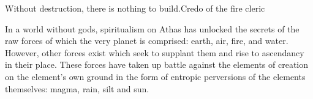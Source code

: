 {Without destruction, there is nothing to build.}{Credo of the fire cleric}


In a world without gods, spiritualism on Athas has unlocked the secrets of the raw forces of which the very planet is comprised: earth, air, fire, and water. However, other forces exist which seek to supplant them and rise to ascendancy in their place. These forces have taken up battle against the elements of creation on the element's own ground in the form of entropic perversions of the elements themselves: magma, rain, silt and sun.

